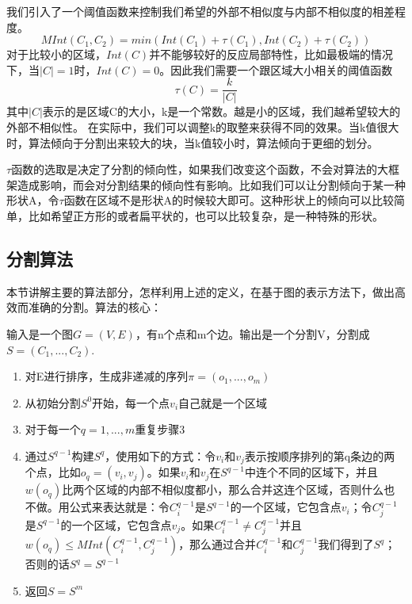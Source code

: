 我们引入了一个阈值函数来控制我们希望的外部不相似度与内部不相似度的相差程度。
\begin{equation}
MInt(C_1,C_2) = min(Int(C_1) + \tau(C_1),Int(C_2) + \tau(C_2))
\end{equation}
对于比较小的区域，\(Int(C)\)并不能够较好的反应局部特性，比如最极端的情况下，当\(|C| = 1\)时，\(Int(C) = 0\)。因此我们需要一个跟区域大小相关的阈值函数
\[\tau (C) = \frac{k}{|C|}\]
其中\(|C|\)表示的是区域C的大小，k是一个常数。越是小的区域，我们越希望较大的外部不相似性。
在实际中，我们可以调整k的取整来获得不同的效果。当k值很大时，算法倾向于分割出来较大的块，当k值较小时，算法倾向于更细的划分。

\(\tau\)函数的选取是决定了分割的倾向性，如果我们改变这个函数，不会对算法的大框架造成影响，而会对分割结果的倾向性有影响。比如我们可以让分割倾向于某一种形状A，令\(\tau\)函数在区域不是形状A的时候较大即可。这种形状上的倾向可以比较简单，比如希望正方形的或者扁平状的，也可以比较复杂，是一种特殊的形状。

\subsection{分割算法}

本节讲解主要的算法部分，怎样利用上述的定义，在基于图的表示方法下，做出高效而准确的分割。算法的核心：

输入是一个图\(G=(V,E)\)，有n个点和m个边。输出是一个分割V，分割成\(S=(C_1,...,C_2).\)

\begin{enumerate}
\item 对E进行排序，生成非递减的序列\(\pi = (o_1,...,o_m)\)
\item 从初始分割\(S^0\)开始，每一个点\(v_i\)自己就是一个区域
\item 对于每一个\(q = 1,...,m\)重复步骤3
\item 通过\(S^{q-1}\)构建\(S^q\)，使用如下的方式：令\(v_i\)和\(v_j\)表示按顺序排列的第q条边的两个点，比如\(o_q = (v_i,v_j)\)。如果\(v_i\)和\(v_j\)在\(S^{q-1}\)中连个不同的区域下，并且\(w(o_q)\)比两个区域的内部不相似度都小，那么合并这连个区域，否则什么也不做。用公式来表达就是：令\(C_{i}^{q-1}\)是\(S^{q-1}\)的一个区域，它包含点\(v_i\)；令\(C_{j}^{q-1}\)是\(S^{q-1}\)的一个区域，它包含点\(v_j\)。如果\(C_{i}^{q-1} \neq C_{j}^{q-1}\)并且\(w(o_q) \leq MInt(C_i^{q-1},C_j^{q-1})\)，那么通过合并\(C_{i}^{q-1}\)和\(C_{j}^{q-1}\)我们得到了\(S^q\)；否则的话\(S^q = S^{q-1}\)
\item 返回\(S = S^m\)
\end{enumerate}


